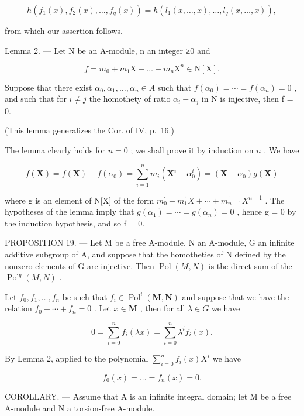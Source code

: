 \[
h \left(f _ {1} (x), f _ {2} (x), \dots , f _ {q} (x)\right) = h \left(l _ {1} (x, \dots , x), \dots , l _ {q} (x, \dots , x)\right),
\]

from which our assertion follows.

Lemma 2. --- Let N be an A-module, n an integer ≥0 and

\[
f = m _ {0} + m _ {1} \mathrm{X} + \dots + m _ {n} \mathrm{X} ^ {n} \in \mathrm{N} [ \mathrm{X} ].
\]

Suppose that there exist \(\alpha_{0}, \alpha_{1}, \ldots, \alpha_{n} \in A\) such that \(f(\alpha_{0}) = \cdots = f(\alpha_{n}) = 0\) , and such that for \(i \neq j\) the homothety of ratio \(\alpha_{i} - \alpha_{j}\) in N is injective, then f = 0.

(This lemma generalizes the Cor. of IV, p.~16.)

The lemma clearly holds for \(n = 0\) ; we shall prove it by induction on \(n\) . We have

\[
f (\mathbf {X}) = f (\mathbf {X}) - f \left(\alpha_ {0}\right) = \sum_ {i = 1} ^ {n} m _ {i} \left(\mathbf {X} ^ {i} - \alpha_ {0} ^ {i}\right) = \left(\mathbf {X} - \alpha_ {0}\right) g (\mathbf {X})
\]

where g is an element of N{[}X{]} of the form \(m_{0}^{\prime} + m_{1}^{\prime} X + \cdots + m_{n-1}^{\prime} X^{n-1}\) . The hypotheses of the lemma imply that \(g(\alpha_{1}) = \cdots = g(\alpha_{n}) = 0\) , hence g = 0 by the induction hypothesis, and so f = 0.

PROPOSITION 19. --- Let M be a free A-module, N an A-module, G an infinite additive subgroup of A, and suppose that the homotheties of N defined by the nonzero elements of G are injective. Then \(\operatorname{Pol}(M,N)\) is the direct sum of the \(\operatorname{Pol}^{q}(M,N)\) .

Let \(f_{0}, f_{1}, \ldots, f_{n}\) be such that \(f_{i} \in \operatorname{Pol}^{i}(\mathbf{M}, \mathbf{N})\) and suppose that we have the relation \(f_{0} + \cdots + f_{n} = 0\) . Let \(x \in \mathbf{M}\) , then for all \(\lambda \in G\) we have

\[
0 = \sum_ {i = 0} ^ {n} f _ {i} (\lambda x) = \sum_ {i = 0} ^ {n} \lambda^ {i} f _ {i} (x).
\]

By Lemma 2, applied to the polynomial \(\sum_{i=0}^{n} f_i(x) X^i\) we have

\[
f _ {0} (x) = \dots = f _ {n} (x) = 0.
\]

COROLLARY. --- Assume that A is an infinite integral domain; let M be a free A-module and N a torsion-free A-module.

